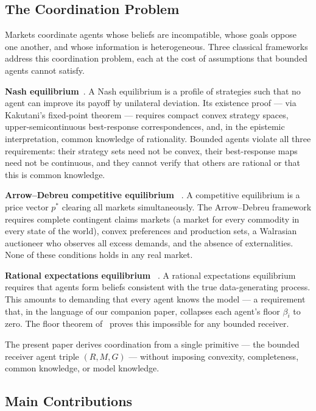 \documentclass[twocolumn,11pt,a4paper]{article}
\theoremstyle{remark}
\begin{document}
\subsection{The Coordination Problem}
\label{sec:intro:coord}

Markets coordinate agents whose beliefs are incompatible, whose goals
oppose one another, and whose information is heterogeneous.  Three classical
frameworks address this coordination problem, each at the cost of assumptions
that bounded agents cannot satisfy.

\medskip
\noindent\textbf{Nash equilibrium}~\cite{nash1950,nash1951}.
A Nash equilibrium is a profile of strategies such that no agent can
improve its payoff by unilateral deviation.  Its existence proof — via
Kakutani's fixed-point theorem — requires compact convex strategy spaces,
upper-semicontinuous best-response correspondences, and, in the
epistemic interpretation, common knowledge of rationality.  Bounded agents
violate all three requirements: their strategy sets need not be convex,
their best-response maps need not be continuous, and they cannot verify
that others are rational or that this is common knowledge.

\medskip
\noindent\textbf{Arrow--Debreu competitive equilibrium}%
~\cite{arrowdebreu1954,debreu1959,mckenzie1954}.
A competitive equilibrium is a price vector $p^*$ clearing all markets
simultaneously.  The Arrow--Debreu framework requires complete contingent
claims markets (a market for every commodity in every state of the world),
convex preferences and production sets, a Walrasian auctioneer who
observes all excess demands, and the absence of externalities.  None of
these conditions holds in any real market.

\medskip
\noindent\textbf{Rational expectations equilibrium}%
~\cite{muth1961,lucas1972}.
A rational expectations equilibrium requires that agents form beliefs
consistent with the true data-generating process.  This amounts to demanding
that every agent knows the model — a requirement that, in the language of
our companion paper, collapses each agent's floor $\beta_i$ to zero.  The
floor theorem of~\cite{sachikonye2025agents} proves this impossible for any
bounded receiver.

\medskip

The present paper derives coordination from a single primitive — the
bounded receiver agent triple $(R,M,G)$ — without imposing convexity,
completeness, common knowledge, or model knowledge.

\subsection{Main Contributions}
\label{sec:intro:contrib}
\end{document}
